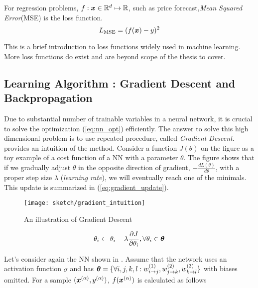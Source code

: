 For regression problems, $ f : \boldsymbol{x} \in \mathbb{R}^d  \mapsto \mathbb{R}$, such as price forecast,\textit{Mean Squared Error}(MSE) is the loss function.
$$
L_{\text{MSE}} = (f(\boldsymbol{x}) - y)^2
$$

This is a brief introduction to loss functions widely used in machine learning. More loss functions do exist and are beyond scope of the thesis to cover.

\subsection{Learning Algorithm : Gradient Descent and Backpropagation}
Due to substantial number of trainable variables in a neural network, it is crucial to solve the optimization (\ref{eq:nn_opt}) efficiently. The answer to solve this high dimensional problem is to use repeated procedure, called \textit{Gradient Descent}.  \addfigure{\ref{fig:gradent_descent_toy}} provides an intuition of the method. Consider a  function $J(\theta)$ on the figure as a toy example of a cost function of a NN with a parameter $\theta$. The figure shows that if we gradually adjust $\theta$ in the opposite direction of gradient, $	-\frac{d L(\theta)}{d \theta}$,  with a proper step size $\lambda$ (\textit{learning rate}), we will eventually reach one of the minimals. This update  is summarized in (\ref{eq:gradient_update}).


%

\begin{figure}[!hbt]
    \begin{center}
		\texttt{[image: sketch/gradient\_intuition]}
		\caption[]{An illustration of Gradient Descent}
		\label{fig:gradent_descent_toy}
	\end{center}
\end{figure}

\begin{align}
 \theta_i \leftarrow \theta_i - \lambda  \frac{\partial J }{\partial \theta_i}, \forall \theta_i \in \boldsymbol{\theta}
\label{eq:gradient_update}
\end{align}


Let's consider again the NN shown in \addfigure{\ref{fig:nn_typical_structure}}. Assume that the network uses an activation function $\sigma$ and has $\boldsymbol{\theta} = \{ \forall i,j,k,l : w^{(1)}_{i \rightarrow j}, w^{(2)}_{j \rightarrow k}, w^{(3)}_{k \rightarrow l}  \}$ with biases omitted. For a sample $(\xa, \ya)$, $f(\xa )$ is  calculated as follows

